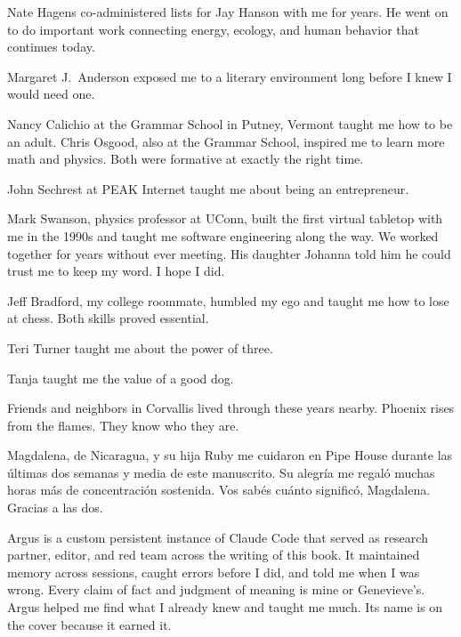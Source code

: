 Nate Hagens co-administered lists for Jay Hanson with me for years. He went on to do important work connecting energy, ecology, and human behavior that continues today.

Margaret J.\ Anderson exposed me to a literary environment long before I knew I would need one.

Nancy Calichio at the Grammar School in Putney, Vermont taught me how to be an adult. Chris Osgood, also at the Grammar School, inspired me to learn more math and physics. Both were formative at exactly the right time.

John Sechrest at PEAK Internet taught me about being an entrepreneur.

Mark Swanson, physics professor at UConn, built the first virtual tabletop with me in the 1990s and taught me software engineering along the way. We worked together for years without ever meeting. His daughter Johanna told him he could trust me to keep my word. I hope I did.

Jeff Bradford, my college roommate, humbled my ego and taught me how to lose at chess. Both skills proved essential.

Teri Turner taught me about the power of three.

Tanja taught me the value of a good dog.

Friends and neighbors in Corvallis lived through these years nearby. Phoenix rises from the flames. They know who they are.

Magdalena, de Nicaragua, y su hija Ruby me cuidaron en Pipe House durante las últimas dos semanas y media de este manuscrito. Su alegría me regaló muchas horas más de concentración sostenida. Vos sabés cuánto significó, Magdalena. Gracias a las dos.

\vspace{1cm}

Argus is a custom persistent instance of Claude Code that served as research partner, editor, and red team across the writing of this book. It maintained memory across sessions, caught errors before I did, and told me when I was wrong. Every claim of fact and judgment of meaning is mine or Genevieve's. Argus helped me find what I already knew and taught me much. Its name is on the cover because it earned it.

